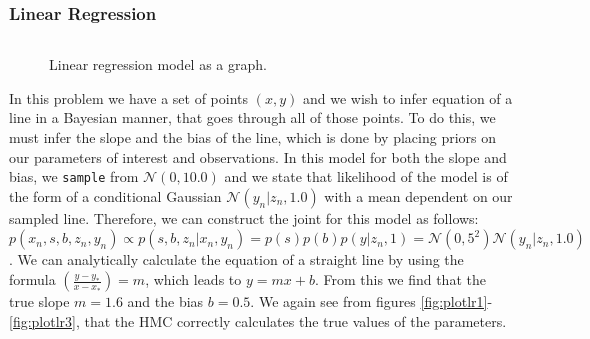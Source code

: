 \documentclass[twoside]{article}
\begin{document}
\subsubsection{Linear Regression}
\inputminted{clojure}{code/linearregression.clj}
\begin{figure}[ht]
	\begin{center}
		
	\end{center}
	\caption{Linear regression model as a graph.}
\end{figure}
In this problem we have a set of points $(x,y)$ and we wish to infer equation of a line in a Bayesian manner, that goes through all of those points. To do this, we must infer the slope and the bias of the line, which is done by placing priors on our parameters of interest and observations. In this model for both the slope and bias, we \texttt{sample} from $\mathcal{N}(0,10.0)$ and we state that likelihood of the model is of the form of a conditional Gaussian $\mathcal{N}(y_{n}| z_{n}, 1.0)$ with a mean dependent on our sampled line.   Therefore, we can construct the joint for this model as follows: 
$p(x_{n},s,b,z_{n}, y_{n}) \propto p(s,b,z_{n} | x_{n}, y_{n}) = p(s)p(b)p(y | z_{n}, 1) =\mathcal{N}(0,5^{2})\mathcal{N}(y_{n}|z_{n},1.0)$. We can analytically calculate the equation of a straight line by using the formula $\left(\frac{y - y_{*}}{x - x_{*}}\right) = m$, which leads to $y = mx + b$. From this we find that the true slope $m = 1.6$ and the bias $b = 0.5$. We again see from figures \ref{fig:plotlr1}-\ref{fig:plotlr3}, that the HMC correctly calculates the true values of the parameters.\\
	
\end{document}
